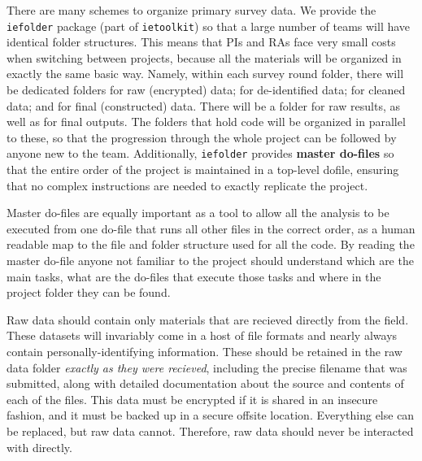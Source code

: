 There are many schemes to organize primary survey data.
We provide the \texttt{iefolder}
package (part of \texttt{ietoolkit}) so that
a large number of teams will have identical folder structures.
This means that PIs and RAs face very small costs
when switching between projects, because all the materials
will be organized in exactly the same basic way.
Namely, within each survey round folder,
there will be dedicated folders for raw (encrypted) data;
for de-identified data; for cleaned data; and for final (constructed) data.
There will be a folder for raw results, as well as for final outputs.
The folders that hold code will be organized in parallel to these,
so that the progression through the whole project can be followed
by anyone new to the team. Additionally, \texttt{iefolder}
provides \textbf{master do-files} so that the entire order
of the project is maintained in a top-level dofile,
ensuring that no complex instructions are needed
to exactly replicate the project.

Master do-files are equally important as a tool to allow all the analysis to 
be executed from one do-file that runs all other files in the correct order, 
as a human readable map to the file and folder structure used for all the 
code. By reading the master do-file anyone not familiar to the project should 
understand which are the main tasks, what are the do-files that execute those 
tasks and where in the project folder they can be found.

Raw data should contain only materials that are recieved directly from the field.
These datasets will invariably come in a host of file formats
and nearly always contain personally-identifying information.
These should be retained in the raw data folder
\textit{exactly as they were recieved},
including the precise filename that was submitted,
along with detailed documentation about the source and contents
of each of the files. This data must be encrypted
if it is shared in an insecure fashion,
and it must be backed up in a secure offsite location.
Everything else can be replaced, but raw data cannot.
Therefore, raw data should never be interacted with directly.

